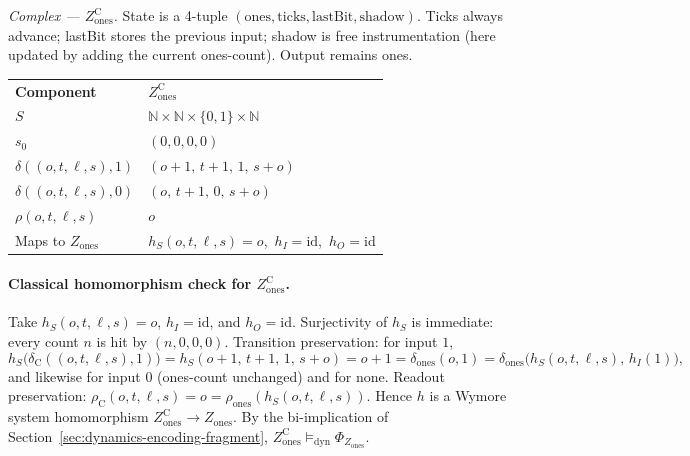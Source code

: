 \textit{Complex --- $Z_{\mathrm{ones}}^{\mathrm{C}}$.}
State is a 4-tuple $(\mathrm{ones},\mathrm{ticks},\mathrm{lastBit},\mathrm{shadow})$. Ticks always advance; lastBit stores the previous input; shadow is free instrumentation (here updated by adding the current ones-count). Output remains ones.

\begingroup
\renewcommand{\arraystretch}{1.2}
\footnotesize
\begin{center}
\begin{tabularx}{0.78\linewidth}{@{}>{\raggedright\arraybackslash}p{2.8cm}Y@{}}
    \headingfont\bfseries Component & \headingfont\bfseries $Z_{\mathrm{ones}}^{\mathrm{C}}$ \\
    \addlinespace[2pt]
    $S$ & $\mathbb{N}\times\mathbb{N}\times\{0,1\}\times\mathbb{N}$ \\
    \addlinespace[2pt]
    $s_0$ & $(0,0,0,0)$ \\
    \addlinespace[2pt]
    $\delta((o,t,\ell,s),1)$ & $(o{+}1,\,t{+}1,\,1,\,s{+}o)$ \\
    \addlinespace[2pt]
    $\delta((o,t,\ell,s),0)$ & $(o,\,t{+}1,\,0,\,s{+}o)$ \\
    \addlinespace[2pt]
    $\rho(o,t,\ell,s)$ & $o$ \\
    \addlinespace[2pt]
    Maps to $Z_{\mathrm{ones}}$ & $h_S(o,t,\ell,s)=o$,\ $h_I=\mathrm{id}$,\ $h_O=\mathrm{id}$ \\
\end{tabularx}
\end{center}
\label{tab:z-ones-cplx}
\endgroup
\vspace{4pt}

\paragraph{Classical homomorphism check for $Z_{\mathrm{ones}}^{\mathrm{C}}$.}
Take $h_S(o,t,\ell,s)=o$, $h_I=\mathrm{id}$, and $h_O=\mathrm{id}$. Surjectivity of $h_S$ is immediate: every count $n$ is hit by $(n,0,0,0)$. Transition preservation: for input $1$,
\[
  h_S\bigl(\delta_{\mathrm{C}}((o,t,\ell,s),1)\bigr)
  = h_S(o{+}1,\,t{+}1,\,1,\,s{+}o)
  = o{+}1
  = \delta_{\mathrm{ones}}(o,1)
  = \delta_{\mathrm{ones}}\bigl(h_S(o,t,\ell,s),\,h_I(1)\bigr),
\]
and likewise for input $0$ (ones-count unchanged) and for $\mathrm{none}$. Readout preservation: $\rho_{\mathrm{C}}(o,t,\ell,s)=o=\rho_{\mathrm{ones}}(h_S(o,t,\ell,s))$. Hence $h$ is a Wymore system homomorphism $Z_{\mathrm{ones}}^{\mathrm{C}}\to Z_{\mathrm{ones}}$. By the bi-implication of Section~\ref{sec:dynamics-encoding-fragment}, $Z_{\mathrm{ones}}^{\mathrm{C}}\models_{\mathrm{dyn}}\Phi_{Z_{\mathrm{ones}}}$.

